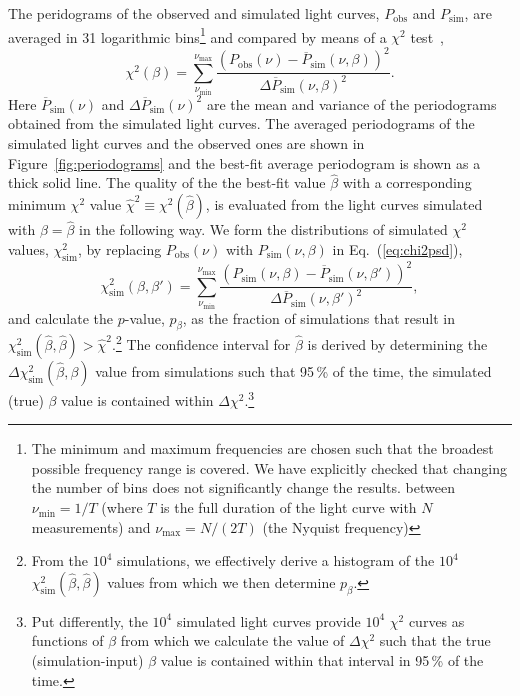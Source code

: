 \documentclass[twocolumn]{aastex62}
\begin{document}
The peridograms of the observed and simulated light curves, ${P}_\mathrm{obs}$ and ${P}_\mathrm{sim}$, are averaged in
31 logarithmic bins\footnote{
The minimum and maximum frequencies are chosen such that the broadest possible frequency range is covered. We have  explicitly checked that changing the number of bins does not significantly change the results.
\citep{1993MNRAS.261..612P} between $\nu_\mathrm{min} = 1 / T$ (where $T$ is the full duration of the light curve with $N$ measurements) and $\nu_\mathrm{max} = N  / (2T)$ (the Nyquist frequency)
}
and compared by means of a $\chi^2$ test~\citep{2014MNRAS.445..437M},
\begin{equation}
    \chi^2(\beta) = \sum_{\nu_\mathrm{min}}^{\nu_\mathrm{max}}\frac{(P_\mathrm{obs}(\nu) - \overline{P}_\mathrm{sim}(\nu,\beta))^2}{\Delta\overline{P}_\mathrm{sim}(\nu,\beta)^2}.\label{eq:chi2psd}
\end{equation}
Here $\overline{P}_\mathrm{sim}(\nu)$ and $\Delta\overline{P}_\mathrm{sim}(\nu)^2$ are the mean and variance of the periodograms obtained from the simulated light curves.
The averaged periodograms of the simulated light curves and the observed ones are shown in Figure~\ref{fig:periodograms} and the best-fit average periodogram is shown as a thick solid line. 
The quality of the the best-fit value $\hat\beta$ with a corresponding minimum $\chi^2$ value $\hat\chi^2\equiv\chi^2(\hat\beta)$, is evaluated from the light curves simulated with $\beta = \hat\beta$ in the following way. We form the distributions of simulated $\chi^2$ values, $\chi^2_\mathrm{sim}$, by replacing $P_\mathrm{obs}(\nu)$ with $P_\mathrm{sim}(\nu,\beta)$ in Eq.~(\ref{eq:chi2psd}),
\begin{equation}
    \chi^2_\mathrm{sim}(\beta,\beta') = \sum_{\nu_\mathrm{min}}^{\nu_\mathrm{max}}\frac{(P_\mathrm{sim}(\nu,\beta) - \overline{P}_\mathrm{sim}(\nu,\beta'))^2}{\Delta\overline{P}_\mathrm{sim}(\nu,\beta')^2},\label{eq:chi2psd_sim}
\end{equation}
and calculate the $p$-value, $p_\beta$, as the  fraction of simulations that result in $\chi^2_\mathrm{sim}(\hat\beta,\hat\beta) > \hat\chi^2$.\footnote{From the $10^4$ simulations, we effectively derive a histogram of the $10^4$ $\chi^2_\mathrm{sim}(\hat\beta,\hat\beta)$ values from which we then determine $p_\beta$.}
The confidence interval for $\hat\beta$ is derived by determining the $\Delta\chi^2_\mathrm{sim}(\hat{\beta},\beta)$ value from simulations such that 95\,\% of the time, the simulated (true) $\beta$ value is contained within $\Delta\chi^2$.\footnote{Put differently, the $10^4$ simulated light curves provide $10^4$ $\chi^2$ curves as functions of $\beta$ from which we calculate the value of $\Delta\chi^2$ such that the true (simulation-input) $\beta$ value is contained within that interval in 95\,\% of the time.}
\end{document}
